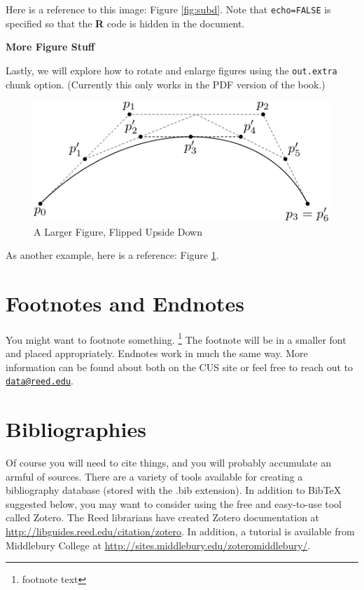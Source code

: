 \documentclass[12pt,twoside]{reedthesis}
\begin{document}
  Here is a reference to this image: Figure \ref{fig:subd}. Note that
  \texttt{echo=FALSE} is specified so that the \textbf{R} code is hidden
  in the document.
  
  \textbf{More Figure Stuff}
  
  Lastly, we will explore how to rotate and enlarge figures using the
  \texttt{out.extra} chunk option. (Currently this only works in the PDF
  version of the book.)
  
  \begin{figure}
  
  {\centering \includegraphics[angle=180, scale=1.1]{figure/subdivision} 
  
  }
  
  \caption[A Larger Figure, Flipped Upside Down]{A Larger Figure, Flipped Upside Down}\label{fig:subd2}
  \end{figure}
  
  As another example, here is a reference: Figure \ref{fig:subd2}.
  
  \section{Footnotes and Endnotes}\label{footnotes-and-endnotes}
  
  You might want to footnote something. \footnote{footnote text} The
  footnote will be in a smaller font and placed appropriately. Endnotes
  work in much the same way. More information can be found about both on
  the CUS site or feel free to reach out to
  \href{mailto:data@reed.edu}{\nolinkurl{data@reed.edu}}.
  
  \section{Bibliographies}\label{bibliographies}
  
  Of course you will need to cite things, and you will probably accumulate
  an armful of sources. There are a variety of tools available for
  creating a bibliography database (stored with the .bib extension). In
  addition to BibTeX suggested below, you may want to consider using the
  free and easy-to-use tool called Zotero. The Reed librarians have
  created Zotero documentation at
  \url{http://libguides.reed.edu/citation/zotero}. In addition, a tutorial
  is available from Middlebury College at
  \url{http://sites.middlebury.edu/zoteromiddlebury/}.
  
\end{document}
